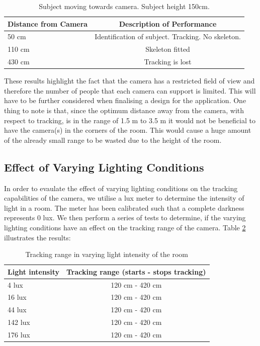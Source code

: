 \documentclass[10pt,a4paper]{article}
\begin{document}
\begin{table}[H]
\center
\begin{tabular}{ | l | c |}
\hline
Distance from Camera & Description of Performance \\
\hline
50 cm & Identification of subject. Tracking. No skeleton.\\
110 cm & Skeleton fitted\\
430 cm & Tracking is lost\\
\hline
\end{tabular}
\caption{Subject moving towards camera. Subject height 150cm.}
\label{cam_range_150_toward}
\end{table}
\noindent
These results highlight the fact that the camera has a restricted field of view and therefore the number of people that each camera can support is limited. This will have to be further considered when finalising a design for the application. One thing to note is that, since  the optimum distance away from the camera, with respect to tracking, is in the range of 1.5 m to 3.5 m it would not be beneficial to have the camera(s) in the corners of the room. This would cause a huge amount of the already small range to be wasted due to the height of the room. 

\subsection{Effect of Varying Lighting Conditions}
\noindent
In order to evaulate the effect of varying lighting conditions on the tracking capabilities of the camera, we utilise a lux meter to determine the intensity of light in a room. The meter has been calibrated such that a complete darkness represents 0 lux. We then perform a series of tests to determine, if the varying lighting conditions have an effect on the tracking range of the camera. Table \ref{cam_range_varying_light} illustrates the results:
\begin{table}[H]
\center
\begin{tabular}{ | l | c |}
\hline
Light intensity & Tracking range (starts - stops tracking) \\
\hline
4 lux & 120 cm - 420 cm\\
16 lux & 120 cm - 420 cm\\
44 lux & 120 cm - 420 cm\\
142 lux & 120 cm - 420 cm\\
176 lux & 120 cm - 420 cm\\
\hline
\end{tabular}
\caption{Tracking range in varying light intensity of the room}
\label{cam_range_varying_light}
\end{table}
\end{document}
